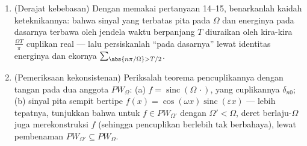 \begin{problem}[{Soal akhir pekan --- $\partial_tu =
\partial^2_{xx}u$, yang diselesaikan sampai tuntas}]
\begin{enumerate}[resume]
        semua cuplikannya: yakni gejala roda pedati stroboskopik,
        yang dimatematikakan.
  \item (Derajat kebebasan) Dengan memakai pertanyaan 14--15, benarkanlah
        kaidah keteknikannya: bahwa sinyal yang terbatas pita pada
        $\Omega$ dan energinya pada dasarnya terbawa oleh
        jendela waktu berpanjang $T$ diuraikan oleh
        kira-kira $\frac{\Omega T}\pi$ cuplikan real ---
        lalu persiskanlah ``pada dasarnya'' lewat identitas energinya
        dan ekornya $\sum_{\abs{n\pi/\Omega} >
        T/2}$.
  \item (Pemeriksaan kekonsistenan) Periksalah teorema pencuplikannya dengan
        tangan pada dua anggota $PW_\Omega$: (a) $f =
        \operatorname{sinc}(\Omega\,\cdot)$, yang cuplikannya
        $\delta_{n0}$; (b) sinyal pita sempit bertipe $f(x) = \cos(\omega x)
        \operatorname{sinc}(\varepsilon x)$ --- lebih tepatnya, tunjukkan bahwa untuk $f \in
        PW_{\Omega'}$ dengan $\Omega' < \Omega$, deret
        berlaju-$\Omega$ juga merekonstruksi $f$
        (sehingga pencuplikan berlebih tak berbahaya), lewat pembenaman $PW_
        {\Omega'} \subseteq PW_\Omega$.
\end{enumerate}


\end{problem}
